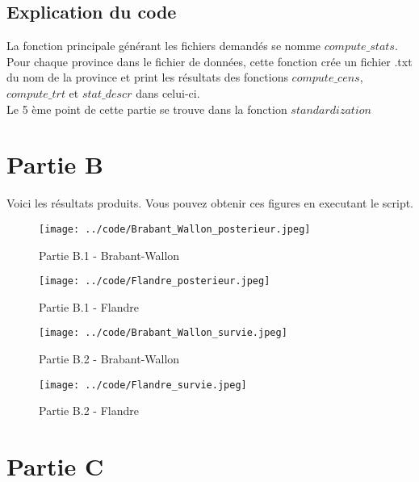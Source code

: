 \documentclass{article}
\begin{document}
\subsection{Explication du code}

La fonction principale générant les fichiers demandés se nomme $compute\_stats$. Pour chaque province dans le fichier de données, cette fonction crée un fichier .txt du nom de la province et print les résultats des fonctions $compute\_cens$, $compute\_trt$ et $stat\_descr$ dans celui-ci. \\
Le 5 ème point de cette partie se trouve dans la fonction $standardization$

\section{Partie B}
Voici les résultats produits. Vous pouvez obtenir ces figures en executant le script.

\begin{figure}[!h]
   \begin{minipage}[c]{.46\linewidth}
	\texttt{[image: ../code/Brabant\_Wallon\_posterieur.jpeg]}
	\caption{Partie B.1 - Brabant-Wallon}
   \end{minipage} \hfill
   \begin{minipage}[c]{.46\linewidth}
	\texttt{[image: ../code/Flandre\_posterieur.jpeg]}
	\caption{Partie B.1 - Flandre}
   \end{minipage}
\end{figure}

\begin{figure}[!h]
   \begin{minipage}[c]{.46\linewidth}
	\texttt{[image: ../code/Brabant\_Wallon\_survie.jpeg]}
	\caption{Partie B.2 - Brabant-Wallon}
   \end{minipage} \hfill
   \begin{minipage}[c]{.46\linewidth}
	\texttt{[image: ../code/Flandre\_survie.jpeg]}
	\caption{Partie B.2 - Flandre}
   \end{minipage}
\end{figure}

\section{Partie C}
\end{document}
